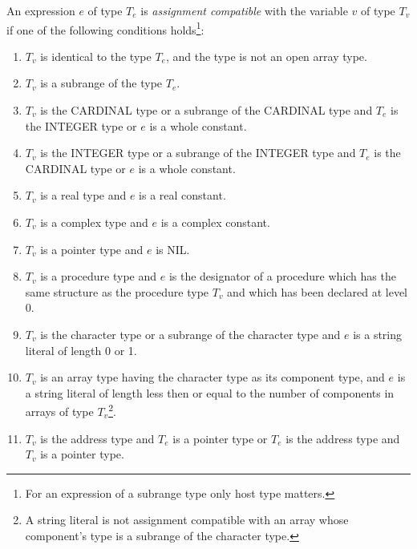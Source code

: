 An expression $e$ of type $T_e$ is {\em assignment compatible}
with the variable $v$ of type $T_v$ if one of the following
conditions holds\footnote{
For an expression of a subrange type only
host type matters.
}:
\renewcommand{\theenumi}{\alph{enumi}}
\begin{enumerate}
\item   $T_v$ is identical to the type $T_e$, and the type is not
        an open array type.

\item   $T_v$ is a subrange of the type $T_e$.

\item   $T_v$ is the CARDINAL type or a subrange of the CARDINAL type
        and $T_e$ is the INTEGER type or $e$ is a whole constant.

\item   $T_v$ is the INTEGER type or a subrange of the INTEGER type
        and $T_e$ is the CARDINAL type or $e$ is a whole constant.

\item   $T_v$ is a real type and $e$ is a real constant.

\item   $T_v$ is a complex type and $e$ is a complex constant.

\item   $T_v$ is a pointer type and $e$ is NIL.

\item   $T_v$ is a procedure type and $e$ is the designator
        of a procedure which has the same structure as
        the procedure type $T_v$ and which has been declared
        at level 0.

\item   $T_v$ is the character type or a subrange of
        the character type and $e$ is a string literal of length 0 or 1.

\item   $T_v$ is an array type having the character type as its
        component type, and $e$ is a string literal of length
        less then or equal to the number of components in arrays of type
        $T_v$\footnote{A string literal is not assignment compatible
        with an array whose component's type is a subrange of
        the character type.}.

\item   $T_v$ is the address type and $T_e$ is a pointer type or
        $T_e$ is the address type and $T_v$ is a pointer type.

\end{enumerate}
\renewcommand{\theenumi}{\arabic{enumi}}

